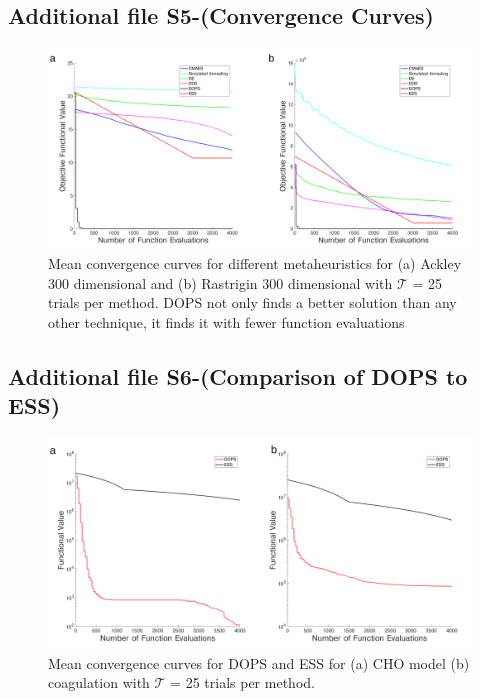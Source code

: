 \documentclass{bmcart}
\begin{document}
\begin{backmatter}
\subsection*{Additional file S5-(Convergence Curves)}
\begin{figure}
\includegraphics[width=1.00\textwidth]{./rachelfigs/fig_s4-crop}
    \caption{Mean convergence curves for different metaheuristics for (a) Ackley 300 dimensional and (b) Rastrigin 300 dimensional with $\mathcal{T}$ = 25 trials per method. DOPS not only finds a better solution than any other technique, it finds it with fewer function evaluations}%
    \label{fig-more-methods}%
\end{figure}

\subsection*{Additional file S6-(Comparison of DOPS to ESS)}
\begin{figure}
\includegraphics[width=1.00\textwidth]{./rachelfigs/fig_s5-crop}
  \caption{Mean convergence curves for DOPS and ESS for (a) CHO model  (b) coagulation with $\mathcal{T}$ = 25 trials per method.}%
    \label{fig-compare-DOPS-ESS}%
\end{figure}


\end{backmatter}
\end{document}
